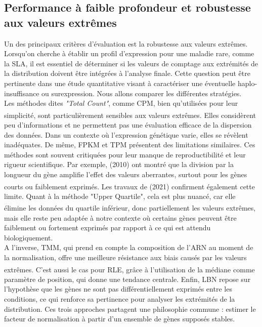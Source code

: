 \subsection{Performance à faible profondeur et robustesse aux valeurs extrêmes} \vspace{3mm} Un des principaux critères d’évaluation est la robustesse aux valeurs extrêmes. Lorsqu’on cherche à établir un profil d'expression pour une maladie rare, comme la SLA, il est essentiel de déterminer si les valeurs de comptage aux extrémités de la distribution doivent être intégrées à l'analyse finale. Cette question peut être pertinente dans une étude quantitative visant à caractériser une éventuelle haplo-insuffisance ou surexpression. Nous allons comparer les différentes stratégies.\\

Les méthodes dites \textit{"Total Count"}, comme CPM, bien qu’utilisées pour leur simplicité, sont particulièrement sensibles aux valeurs extrêmes\textsuperscript{\cite{dillies_comprehensive_2013}}. Elles considèrent peu d'informations et ne permettent pas une évaluation efficace de la dispersion des données. Dans un contexte où l'expression génétique varie, elles se révèlent inadéquates. De même, FPKM et TPM présentent des limitations similaires. Ces méthodes sont souvent critiquées pour leur manque de reproductibilité et leur rigueur scientifique. Par exemple, \citeauthor{robinson_scaling_2010} (2010) ont montré que la division par la longueur du gène amplifie l’effet des valeurs aberrantes, surtout pour les gènes courts ou faiblement exprimés\textsuperscript{\cite{anders_differential_2010}}. Les travaux de \citeauthor{zhao_tpm_2021} (2021) confirment également cette limite. Quant à la méthode "Upper Quartile", cela est plus nuancé, car elle élimine les données du quartile inférieur\textsuperscript{\cite{dillies_comprehensive_2013}}, donc partiellement les valeurs extrêmes, mais elle reste peu adaptée à notre contexte où certains gènes peuvent être faiblement ou fortement exprimés par rapport à ce qui est attendu biologiquement.\\

A l'inverse, TMM, qui prend en compte la composition de l’ARN au moment de la normalisation, offre une meilleure résistance aux biais causés par les valeurs extrêmes\textsuperscript{\cite{robinson_scaling_2010}}. C'est aussi le cas pour RLE, grâce à l’utilisation de la médiane comme paramètre de position, qui donne une tendance centrale. Enfin, LBN repose sur l’hypothèse que les gènes ne sont pas différentiellement exprimés entre les conditions, ce qui renforce sa pertinence pour analyser les extrémités de la distribution. Ces trois approches partagent une philosophie commune : estimer le facteur de normalisation à partir d’un ensemble de gènes supposés stables.

